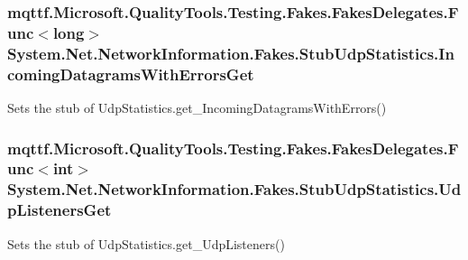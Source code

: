 \hypertarget{class_system_1_1_net_1_1_network_information_1_1_fakes_1_1_stub_udp_statistics_a5fb5e95b1b05270e0657ecd304681187}{
\subsubsection[{Incoming\-Datagrams\-With\-Errors\-Get}]{\setlength{\rightskip}{0pt plus 5cm}mqttf.\-Microsoft.\-Quality\-Tools.\-Testing.\-Fakes.\-Fakes\-Delegates.\-Func$<$long$>$ System.\-Net.\-Network\-Information.\-Fakes.\-Stub\-Udp\-Statistics.\-Incoming\-Datagrams\-With\-Errors\-Get}}\label{class_system_1_1_net_1_1_network_information_1_1_fakes_1_1_stub_udp_statistics_a5fb5e95b1b05270e0657ecd304681187}


Sets the stub of Udp\-Statistics.\-get\-\_\-\-Incoming\-Datagrams\-With\-Errors()

\hypertarget{class_system_1_1_net_1_1_network_information_1_1_fakes_1_1_stub_udp_statistics_aefdd8b3f504783342fa1221b7bcd78e5}{
\subsubsection[{Udp\-Listeners\-Get}]{\setlength{\rightskip}{0pt plus 5cm}mqttf.\-Microsoft.\-Quality\-Tools.\-Testing.\-Fakes.\-Fakes\-Delegates.\-Func$<$int$>$ System.\-Net.\-Network\-Information.\-Fakes.\-Stub\-Udp\-Statistics.\-Udp\-Listeners\-Get}}\label{class_system_1_1_net_1_1_network_information_1_1_fakes_1_1_stub_udp_statistics_aefdd8b3f504783342fa1221b7bcd78e5}


Sets the stub of Udp\-Statistics.\-get\-\_\-\-Udp\-Listeners()



